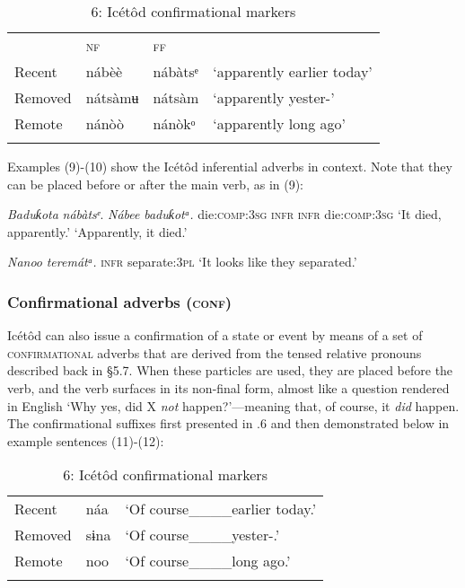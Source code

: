 \begin{table}
\begin{table}
\caption{5: Icétôd inferential adverbs}
\label{tab:9}


\begin{tabularx}{\textwidth}{XXXX} & \textsc{nf} & \textsc{ff} & \\
\lsptoprule
Recent & nábèè & nábàtsᵉ & ‘apparently earlier today’\\
Removed & nátsàmʉ & nátsàm & ‘apparently yester-’\\
Remote & nánòò & nánòkᵒ & ‘apparently long ago’\\
\lspbottomrule
\end{tabularx}
\end{table}
Examples (9)-(10) show the Icétôd inferential adverbs in context. Note that they can be placed before or after the main verb, as in (9):




\textit{Baduƙota     }\textit{nábàtsᵉ}.  \textit{Nábee}\textit{    baduƙotᵃ.}
die:\textsc{comp:3sg   infr}    \textsc{infr}     die:\textsc{comp:3sg}
‘It died, apparently.’    ‘Apparently, it died.’




\textit{Nanoo}\textit{   teremátᵃ.}
\textsc{infr}     separate:\textsc{3pl}
‘It looks like they separated.’




\subsubsection{Confirmational adverbs (\textsc{conf})}

Icétôd can also issue a confirmation of a state or event by means of a set of \textsc{confirmational }adverbs that are derived from the tensed relative pronouns described back in §5.7. When these particles are used, they are placed before the verb, and the verb surfaces in its non-final form, almost like a question rendered in English ‘Why yes, did X \textit{not} happen?’—meaning that, of course, it \textit{did} happen. The confirmational suffixes first presented in .6 and then demonstrated below in example sentences (11)-(12):


\begin{table}
\caption{6: Icétôd confirmational markers}
\label{tab:9}


\begin{tabularx}{\textwidth}{XXX}
\lsptoprule

Recent & náa & ‘Of course\_\_\_\_earlier today.’\\
Removed & sɨna & ‘Of course\_\_\_\_yester-.’\\
Remote & noo & ‘Of course\_\_\_\_long ago.’\\
\lspbottomrule
\end{tabularx}
\end{table}




\end{table}
